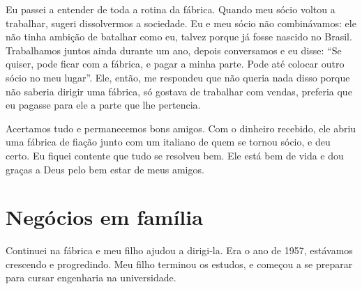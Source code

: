 
Eu passei a entender de toda a rotina da fábrica. Quando meu sócio voltou a
trabalhar, sugeri dissolvermos a sociedade. Eu e
meu sócio não combinávamos: ele não tinha ambição de batalhar como eu,
talvez porque já fosse nascido no Brasil. Trabalhamos juntos
ainda durante um ano, depois conversamos e eu disse: ``Se quiser,
pode ficar com a fábrica, e pagar a minha parte. Pode até colocar outro
sócio no meu lugar''. Ele, então, me respondeu que não queria nada disso
porque não saberia dirigir uma fábrica, só gostava de trabalhar com
vendas, preferia que eu pagasse para ele a parte que lhe pertencia.

Acertamos tudo e permanecemos bons amigos. Com o dinheiro recebido, ele abriu uma fábrica de fiação junto com um italiano de quem se tornou sócio, e deu
certo. Eu fiquei contente que tudo se resolveu bem. Ele está bem de
vida e dou graças a Deus pelo bem estar de meus amigos.

\chapter{Negócios em família}

Continuei na fábrica e meu filho ajudou a dirigi-la. Era o ano
de 1957, estávamos crescendo e progredindo. Meu filho
terminou os estudos, e começou a se preparar para cursar engenharia na universidade.



